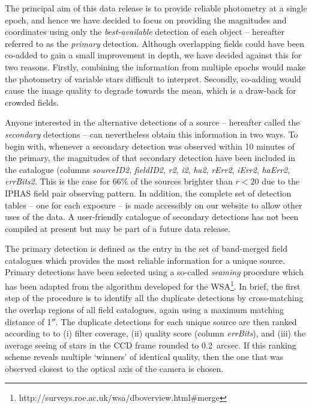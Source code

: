 \documentclass[useAMS,usenatbib]{mn2e}
\def\arcsec{$''$}
\begin{document}
The principal aim of this data release is to provide 
reliable photometry at a single epoch,
and hence we have decided
to focus on providing the magnitudes
and coordinates using only the \emph{best-available} 
detection of each object -- 
hereafter referred to as the \emph{primary} detection.
Although overlapping fields could have been co-added 
to gain a small improvement in depth, 
we have decided against this for two reasons.
Firstly, combining the information from multiple epochs
would make the photometry of variable stars difficult to interpret.
Secondly, co-adding would cause the image quality to degrade towards the mean,
which is a draw-back for crowded fields.

Anyone interested in the alternative detections of a source
-- hereafter called the \emph{secondary} detections --
can nevertheless obtain this information in two ways.
To begin with, whenever a secondary detection was observed 
within 10 minutes of the primary,
the magnitudes of that secondary detection
have been included in the catalogue
(columns \emph{sourceID2}, \emph{fieldID2}, 
\emph{r2}, \emph{i2}, \emph{ha2},
\emph{rErr2}, \emph{iErr2}, \emph{haErr2}, \emph{errBits2}.
This is the case for 66\% of the sources brighter than $r<20$
due to the IPHAS field pair observing pattern.
In addition, the complete set of detection tables -- one for each exposure -- 
is made accessibly on our website to allow other uses of the data.
A user-friendly catalogue of secondary detections 
has not been compiled at present 
but may be part of a future data release.

The primary detection is defined as the entry in the 
set of band-merged field catalogues which provides 
the most reliable information for a unique source.
Primary detections have been selected using a so-called \emph{seaming} procedure
which has been adapted from the algorithm developed for the WSA\footnote{http://surveys.roe.ac.uk/wsa/dboverview.html\#merge}.
In brief, the first step of the procedure is to identify all the duplicate detections
by cross-matching the overlap regions of all field catalogues,
again using a maximum matching distance of 1\arcsec.
The duplicate detections for each unique source are then ranked according to
to (i) filter coverage, (ii) quality score (column \emph{errBits}),
and (iii) the average seeing of stars in the CCD frame rounded to 0.2~arcsec.
If this ranking scheme reveals multiple `winners' of identical quality,
then the one that was observed closest to the optical axis of the camera is chosen.
\end{document}
